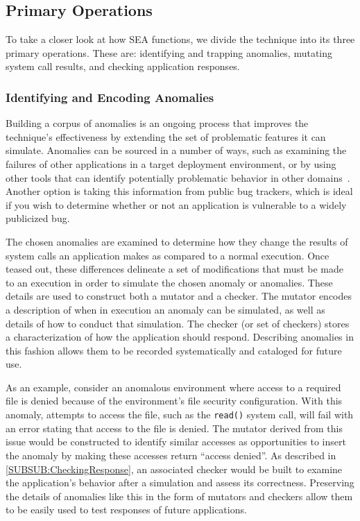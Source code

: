 \subsection{Primary Operations}
\label{SEC:PrimaryOperations}

To take a closer look at how SEA functions,
we divide the technique
into its three primary operations.
These are:
identifying and trapping anomalies,
mutating system call results,
and checking application responses.

\subsubsection{Identifying and Encoding Anomalies}
\label{SUBSUB:IdentifyingAndEncoding}
Building a corpus of anomalies
is an ongoing process that improves the technique's
effectiveness by extending the set of problematic features it can simulate.
Anomalies can be sourced
in a number of ways,
such as
examining the failures of other applications
in a target deployment environment,
or by using other tools that can identify
potentially problematic behavior in other domains~\cite{Zhuang_NSDI_2014,
rasley2015detecting}.
Another option is taking this information from
public bug trackers, which is ideal
if you wish to determine
whether or not an application
is vulnerable to a widely publicized bug.

The chosen anomalies are examined
to determine how they change the results
of system calls an application makes as
compared to a normal execution.
Once teased out,
these differences delineate
a set of modifications
that must be made to an execution
in order to simulate the chosen anomaly or anomalies.
These details are used to
construct both a mutator and a checker.
The mutator encodes
a description of when in execution an anomaly can be simulated,
as well as details of how to conduct that simulation.
The checker
(or set of checkers)
stores a characterization of
how the application should respond.
Describing anomalies in this fashion
allows them to be recorded systematically and cataloged for future use.

As an example, consider
an anomalous environment
where access to a required file is denied because of
the environment's file security configuration.
With this anomaly,
attempts to access the file,
such as
the {\tt read()} system call,
will fail with an error stating that access to the file is denied.
The mutator derived from this issue would be constructed to
identify similar accesses as opportunities
to insert the anomaly
by making these
accesses return ``access denied''.
As described in \ref{SUBSUB:CheckingResponse},
an associated checker would be built to
examine the application's behavior after a simulation and assess its
correctness.
Preserving the details of anomalies like this in the form of
mutators and checkers
allow them to be
easily used
to test responses of future applications.

